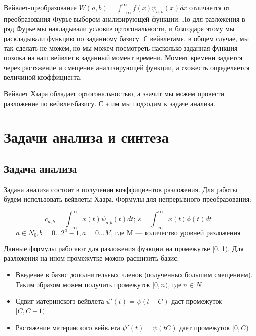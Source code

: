 \documentclass[a4paper]{article}
\begin{document}
	Вейвлет-преобразование $ W(a,b) = \int_{-\infty}^{\infty} f(x) \psi_{a, b}(x)dx $ отличается от преобразования Фурье выбором анализирующей функции. Но для разложения в ряд Фурье мы накладывали условие ортогональности, и благодаря этому мы раскладывали функцию по заданному базису. С вейвлетами, в общем случае, мы так сделать не можем, но мы можем посмотреть насколько заданная функция похожа на наш вейвлет в заданный момент времени. Момент времени задается через растяжение и смещение анализирующей функции, а схожесть определяется величиной коэффициента.
	
	Вейвлет Хаара обладает ортогональностью, а значит мы можем провести разложение по вейвлет-базису. С этим мы подходим к задаче анализа.
	
	\newpage
	
	\section{Задачи анализа и синтеза}
	
	\subsection{Задача анализа}
	
	Задана анализа состоит в получении коэффициентов разложения. Для работы будем использовать вейвлеты Хаара. Формулы для непрерывного преобразования:
	
	$$ 
		c_{a, b} = \int_{-\infty}^{\infty}
		 x(t)\psi_{a, b}(t) dt
		\text{; }
		s = \int_{-\infty}^{\infty} x(t)\phi(t) dt$$
	$$ 
		a \in N_0, b = 0...2^a-1, a=0...M
		\text{, где M --- количество уровней разложения} 
	$$
	
	Данные формулы работают для разложения функции на промежутке [0, 1). Для разложения на ином промежутке можно расширить базис:
	
	\begin{itemize}
		\item  Введение в базис дополнительных членов (полученных большим смещением). Таким образом можем получить промежуток $[0, n)$, где $n \in N$
		
		\item Сдвиг материнского вейвлета $\psi'(t) = \psi(t - C)$ даст промежуток $[C, C + 1)$
		
		\item Растяжение материнского вейвлета $\psi'(t) = \psi(tC)$ дает промежуток $[0, C)$
	\end{itemize}
\end{document}

